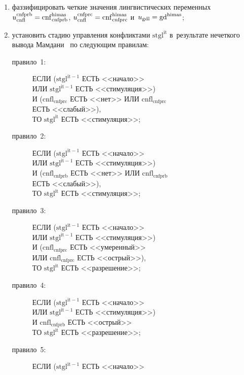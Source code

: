 \begin{multicols}{2}
\begin{enumerate}[(1)]
  \item фаззифицировать четкие значения лингвистических переменных 
  $u_{\mathrm{cnfl}}^{\mathrm{cnfprb}} \hm= \mathrm{cnf}_{\mathrm{cnfprb}}^{\mathrm{himas}}$, $u_{\mathrm{cnfl}}^{\mathrm{cnfprc}} 
\hm= \mathrm{cnf}_{\mathrm{cnfprc}}^{\mathrm{himas}}$ и~$u_{\mathrm{gdl}}\hm= \mathrm{gd}^{\mathrm{himas}}$;
  \item установить стадию управления конфликтами $\mathrm{stgl}^{\mathrm{it}}$ в~результате 
нечеткого вывода Мамдани~\cite{16-lis} по следующим правилам:
  \begin{description}
\item[правило~1:] ЕСЛИ ($\mathrm{stgl}^{\mathrm{it}-1}$ ЕСТЬ <<{начало}>>\\
ИЛИ $\mathrm{stgl}^{\mathrm{it}-1}$ ЕСТЬ <<{стимуляция}>>) \\ 
И ($\mathrm{cnfl}_{\mathrm{cnfprc}}$ ЕСТЬ <<{нет}>> ИЛИ $\mathrm{cnfl}_{\mathrm{cnfprc}}$\\
ЕСТЬ <<{слабый}>>), \\ 
ТО $\mathrm{stgl}^{\mathrm{it}}$ ЕСТЬ <<{стимуляция}>>;
\item[правило~2:] ЕСЛИ ($\mathrm{stgl}^{\mathrm{it}-1}$ ЕСТЬ <<{начало}>>\\
ИЛИ $\mathrm{stgl}^{\mathrm{it}-1}$ ЕСТЬ <<{стимуляция}>>)\\  
И ($\mathrm{cnfl}_{\mathrm{cnfprb}}$ ЕСТЬ <<{нет}>> ИЛИ $\mathrm{cnfl}_{\mathrm{cnfprb}}$\\ 
ЕСТЬ <<{слабый}>>), \\ 
ТО $\mathrm{stgl}^{\mathrm{it}}$ ЕСТЬ <<{стимуляция}>>;
\item[правило~3:] ЕСЛИ ($\mathrm{stgl}^{\mathrm{it}-1}$ ЕСТЬ <<{начало}>>\\
ИЛИ $\mathrm{stgl}^{\mathrm{it}-1}$ ЕСТЬ <<{стимуляция}>>)\\  
И ($\mathrm{cnfl}_{\mathrm{cnfprc}}$ ЕСТЬ <<{умеренный}>>\\
ИЛИ $\mathrm{cnfl}_{\mathrm{cnfprc}}$ ЕСТЬ <<{острый}>>),\\  
ТО $\mathrm{stgl}^{\mathrm{it}}$ ЕСТЬ <<{разрешение}>>;
\item[правило~4:] ЕСЛИ ($\mathrm{stgl}^{\mathrm{it}-1}$ ЕСТЬ <<{начало}>>\\
ИЛИ  $\mathrm{stgl}^{\mathrm{it}-1}$ ЕСТЬ <<{стимуляция}>>) \\ 
И $\mathrm{cnfl}_{\mathrm{cnfprb}}$ ЕСТЬ <<{острый}>>\\
ТО $\mathrm{stgl}^{\mathrm{it}}$ ЕСТЬ  <<{разрешение}>>;
\item[правило~5:] ЕСЛИ ($\mathrm{stgl}^{\mathrm{it}-1}$ ЕСТЬ <<{начало}>>\\

\end{description}
\end{enumerate}
\end{multicols}
